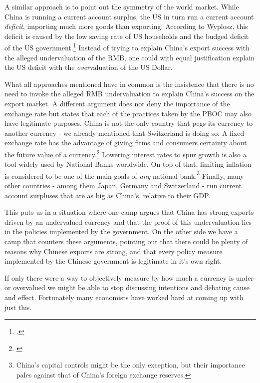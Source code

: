 A similar approach is to point out the symmetry of the world market. 
While China is running a current account surplus, the US in turn run a 
current account \emph{deficit}, importing much more goods than 
exporting. According to Wyplosz, this deficit is caused by the low 
saving rate of US households and the budged deficit of the US 
government.\footnote{\cite[pp. 39-40]{Wyplosz2010}.} Instead of trying 
to explain China's export success with the alleged undervaluation of the 
RMB, one could with equal justification explain the US deficit with the 
\emph{over}valuation of the US Dollar. 

What all approaches mentioned have in common is the insistence that 
there is no need to invoke the alleged RMB undervaluation to explain 
China's success on the export market. A different argument does not deny 
the importance of the exchange rate but states that each of the 
practices taken by the PBOC may also have legitimate purposes. China is 
not the only country that pegs its currency to another currency - we 
already mentioned that Switzerland is doing so. A fixed exchange rate 
has the advantage of giving firms and consumers certainty about the 
future value of a currency.\footnote{\cite[p.  515]{Krugman2008}} 
Lowering interest rates to spur growth is also a tool widely used by 
National Banks worldwide. On top of that, limiting inflation is 
considered to be one of the main goals of \emph{any} national 
bank.\footnote{China's capital controls might be the only exception, but 
	their importance pales against that of China's foreign exchange 
reserves.} Finally, many other countries - among them Japan, Germany and 
Switzerland - run current account surpluses that are as big as China's, 
relative to their GDP.

This puts us in a situation where one camp argues that China has strong 
exports driven by an undervalued currency and that the proof of this 
undervaluation lies in the policies implemented by the government. On 
the other side we have a camp that counters these arguments, pointing 
out that there could be plenty of reasons why Chinese exports are 
strong, and that every policy measure implemented by the Chinese 
government is legitimate in it's own right.

If only there were a way to objectively measure by how much a currency 
is under- or overvalued we might be able to stop discussing intentions 
and debating cause and effect. Fortunately many economists have worked 
hard at coming up with just this.

